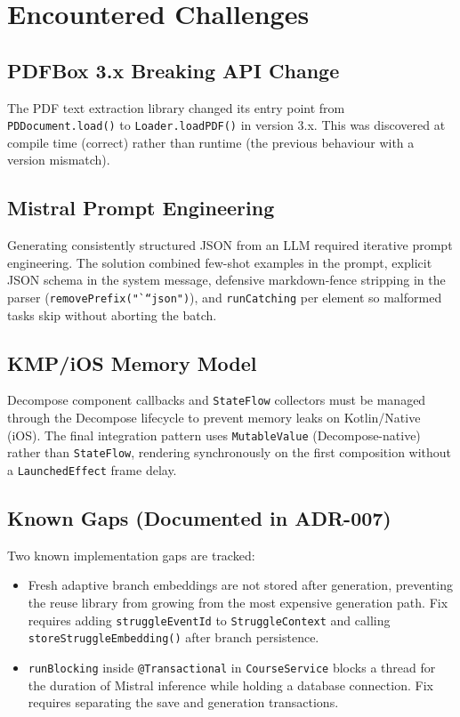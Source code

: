 \section{Encountered Challenges}
\label{sec:challenges}

\subsection{PDFBox 3.x Breaking API Change}
The PDF text extraction library changed its entry point from \texttt{PDDocument.load()} to \texttt{Loader.loadPDF()} in version 3.x. This was discovered at compile time (correct) rather than runtime (the previous behaviour with a version mismatch).

\subsection{Mistral Prompt Engineering}
Generating consistently structured JSON from an LLM required iterative prompt engineering. The solution combined few-shot examples in the prompt, explicit JSON schema in the system message, defensive markdown-fence stripping in the parser (\texttt{removePrefix("```json")}), and \texttt{runCatching} per element so malformed tasks skip without aborting the batch.

\subsection{KMP/iOS Memory Model}
Decompose component callbacks and \texttt{StateFlow} collectors must be managed through the Decompose lifecycle to prevent memory leaks on Kotlin/Native (iOS). The final integration pattern uses \texttt{MutableValue} (Decompose-native) rather than \texttt{StateFlow}, rendering synchronously on the first composition without a \texttt{LaunchedEffect} frame delay.

\subsection{Known Gaps (Documented in ADR-007)}
Two known implementation gaps are tracked:
\begin{itemize}
    \item Fresh adaptive branch embeddings are not stored after generation, preventing the reuse library from growing from the most expensive generation path. Fix requires adding \texttt{struggleEventId} to \texttt{StruggleContext} and calling \texttt{storeStruggleEmbedding()} after branch persistence.
    \item \texttt{runBlocking} inside \texttt{@Transactional} in \texttt{CourseService} blocks a thread for the duration of Mistral inference while holding a database connection. Fix requires separating the save and generation transactions.
\end{itemize}

